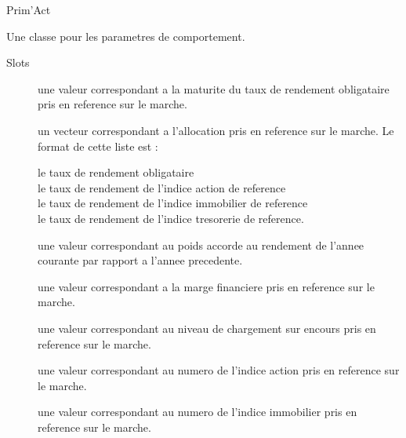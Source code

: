 \documentclass[a4paper]{book}
\begin{document}
%
\begin{Author}\relax
Prim'Act
\end{Author}
%
\begin{Description}\relax
Une classe pour les parametres de comportement.
\end{Description}
%
\begin{Section}{Slots}

\begin{description}

\item[] une valeur  correspondant a la maturite du taux de rendement obligataire pris en
reference sur le marche.

\item[] un vecteur  correspondant a l'allocation pris en reference sur le marche.
Le format de cette liste est :
\begin{description}

\item[le taux de rendement obligataire] 
\item[le taux de rendement de l'indice action de reference] 
\item[le taux de rendement de l'indice immobilier de reference] 
\item[le taux de rendement de l'indice tresorerie de reference.] 

\end{description}


\item[] une valeur  correspondant au poids accorde au rendement de l'annee courante par
rapport a l'annee precedente.

\item[] une valeur  correspondant a la marge financiere pris en reference sur le marche.

\item[] une valeur  correspondant au niveau de chargement sur encours
pris en reference sur le marche.

\item[] une valeur  correspondant au numero de l'indice action
pris en reference sur le marche.

\item[] une valeur  correspondant au numero de l'indice immobilier
pris en reference sur le marche.

\end{description}
\end{Section}
\end{document}

